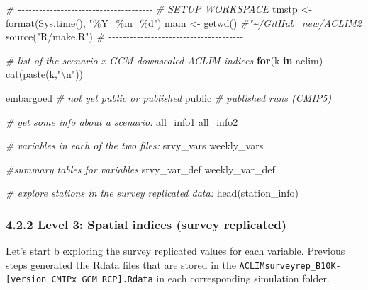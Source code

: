 \documentclass[
]{article}
\newenvironment{Shaded}{\begin{snugshade}}{\end{snugshade}}
\newcommand{\CommentTok}[1]{\textcolor[rgb]{0.56,0.35,0.01}{\textit{#1}}}
\newcommand{\ControlFlowTok}[1]{\textcolor[rgb]{0.13,0.29,0.53}{\textbf{#1}}}
\newcommand{\FunctionTok}[1]{\textcolor[rgb]{0.00,0.00,0.00}{#1}}
\newcommand{\NormalTok}[1]{#1}
\newcommand{\OtherTok}[1]{\textcolor[rgb]{0.56,0.35,0.01}{#1}}
\newcommand{\SpecialCharTok}[1]{\textcolor[rgb]{0.00,0.00,0.00}{#1}}
\newcommand{\StringTok}[1]{\textcolor[rgb]{0.31,0.60,0.02}{#1}}
\begin{document}
\begin{Shaded}
\begin{Highlighting}[]
    \CommentTok{\# {-}{-}{-}{-}{-}{-}{-}{-}{-}{-}{-}{-}{-}{-}{-}{-}{-}{-}{-}{-}{-}{-}{-}{-}{-}{-}{-}{-}{-}{-}{-}{-}{-}{-}{-}{-}{-}{-}}
    \CommentTok{\# SETUP WORKSPACE}
\NormalTok{    tmstp  }\OtherTok{\textless{}{-}} \FunctionTok{format}\NormalTok{(}\FunctionTok{Sys.time}\NormalTok{(), }\StringTok{"\%Y\_\%m\_\%d"}\NormalTok{)}
\NormalTok{    main   }\OtherTok{\textless{}{-}} \FunctionTok{getwd}\NormalTok{()  }\CommentTok{\#"\textasciitilde{}/GitHub\_new/ACLIM2}
    \FunctionTok{source}\NormalTok{(}\StringTok{"R/make.R"}\NormalTok{)}
    \CommentTok{\# {-}{-}{-}{-}{-}{-}{-}{-}{-}{-}{-}{-}{-}{-}{-}{-}{-}{-}{-}{-}{-}{-}{-}{-}{-}{-}{-}{-}{-}{-}{-}{-}{-}{-}{-}{-}{-}{-}}
    
    \CommentTok{\# list of the scenario x GCM downscaled ACLIM indices}
    \ControlFlowTok{for}\NormalTok{(k }\ControlFlowTok{in}\NormalTok{ aclim)}
     \FunctionTok{cat}\NormalTok{(}\FunctionTok{paste}\NormalTok{(k,}\StringTok{"}\SpecialCharTok{\textbackslash{}n}\StringTok{"}\NormalTok{))}
    
\NormalTok{    embargoed }\CommentTok{\# not yet public or published}
\NormalTok{    public    }\CommentTok{\# published runs (CMIP5)}
    
    \CommentTok{\# get some info about a scenario:}
\NormalTok{    all\_info1}
\NormalTok{    all\_info2}
   
    \CommentTok{\# variables in each of the two files:}
\NormalTok{    srvy\_vars}
\NormalTok{    weekly\_vars}
  
    \CommentTok{\#summary tables for variables}
\NormalTok{    srvy\_var\_def}
\NormalTok{    weekly\_var\_def}
    
    \CommentTok{\# explore stations in the survey replicated data:}
    \FunctionTok{head}\NormalTok{(station\_info)}
\end{Highlighting}
\end{Shaded}

\hypertarget{level-3-spatial-indices-survey-replicated}{%
\subsubsection{4.2.2 Level 3: Spatial indices (survey
replicated)}\label{level-3-spatial-indices-survey-replicated}}

Let's start b exploring the survey replicated values for each variable.
Previous steps generated the Rdata files that are stored in the
\texttt{ACLIMsurveyrep\_B10K-{[}version\_CMIPx\_GCM\_RCP{]}.Rdata} in
each corresponding simulation folder.
\end{document}
